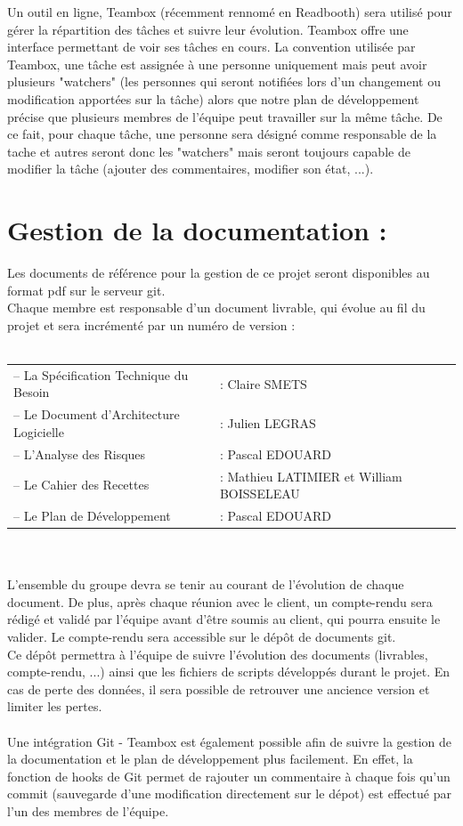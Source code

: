 \documentclass[a4paper,11pt,french]{article}
\begin{document}
\newpage



Un outil en ligne, Teambox (récemment rennomé en Readbooth) sera utilisé pour gérer la répartition des tâches et suivre leur évolution. Teambox offre une interface permettant de voir ses tâches en cours. La convention utilisée par Teambox, une tâche est assignée à une personne uniquement mais peut avoir plusieurs "watchers" (les personnes qui seront notifiées lors d'un changement ou modification apportées sur la tâche) alors que notre plan de développement précise que plusieurs membres de l'équipe peut travailler sur la même tâche. De ce fait, pour chaque tâche, une personne sera désigné comme responsable de la tache et autres seront donc les "watchers" mais seront toujours capable de modifier la tâche (ajouter des commentaires, modifier son état, ...).

\section{Gestion de la documentation :}
Les documents de référence pour la gestion de ce projet seront disponibles au format pdf sur le serveur git. \\

Chaque membre est responsable d'un document livrable, qui évolue au fil du projet et sera incrémenté par un numéro de version :\\ \\
\begin{tabular}{ll}
–	La Spécification Technique du Besoin 	& : Claire SMETS\\
–	Le Document d'Architecture Logicielle 	& : Julien LEGRAS\\
–	L'Analyse des Risques 					& : Pascal EDOUARD\\
–	Le Cahier des Recettes 					& : Mathieu LATIMIER et William BOISSELEAU\\
–	Le Plan de Développement 				& : Pascal EDOUARD\\
\end{tabular}
\\ \\

L'ensemble du groupe devra se tenir au courant de l'évolution de chaque document. De plus, après chaque réunion avec le client, un compte-rendu sera rédigé et validé par l'équipe avant d'être soumis au client, qui pourra ensuite le valider. Le compte-rendu sera accessible sur le dépôt de documents git.
\\
Ce dépôt permettra à l'équipe de suivre l'évolution des documents (livrables, compte-rendu, ...) ainsi que les fichiers de scripts développés durant le projet. En cas de perte des données, il sera possible de retrouver une ancience version et limiter les pertes.
\\ \\
Une intégration Git - Teambox est également possible afin de suivre la gestion de la documentation et le plan de développement plus facilement. En effet, la fonction de hooks de Git permet de rajouter un commentaire à chaque fois qu'un commit (sauvegarde d'une modification directement sur le dépot) est effectué par l'un des membres de l'équipe.
\end{document}
